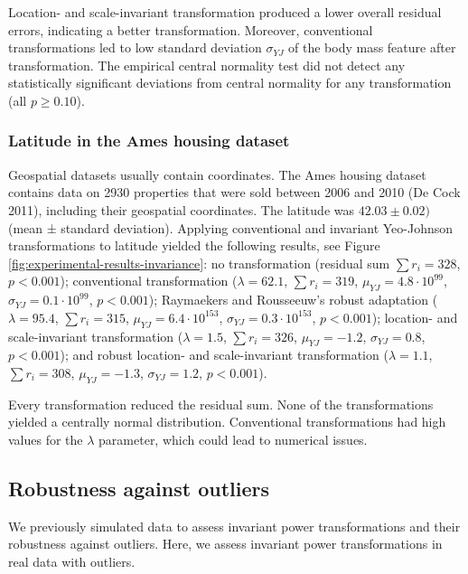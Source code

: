 \documentclass[
  a4paper,
]{article}
\begin{document}
Location- and scale-invariant transformation produced a lower overall
residual errors, indicating a better transformation. Moreover,
conventional transformations led to low standard deviation
\(\sigma_{YJ}\) of the body mass feature after transformation. The
empirical central normality test did not detect any statistically
significant deviations from central normality for any transformation
(all \(p \geq 0.10\)).

\subsubsection{Latitude in the Ames housing
dataset}\label{latitude-in-the-ames-housing-dataset}

Geospatial datasets usually contain coordinates. The Ames housing
dataset contains data on 2930 properties that were sold between 2006 and
2010 (De Cock 2011), including their geospatial coordinates. The
latitude was \(42.03 \pm 0.02)\) (mean ± standard deviation). Applying
conventional and invariant Yeo-Johnson transformations to latitude
yielded the following results, see Figure
\ref{fig:experimental-results-invariance}: no transformation (residual
sum \(\sum r_i = 328\), \(p < 0.001\)); conventional transformation
(\(\lambda = 62.1\), \(\sum r_i = 319\),
\(\mu_{YJ} = 4.8 \cdot 10^{99}\), \(\sigma_{YJ} = 0.1 \cdot 10^{99}\),
\(p < 0.001\)); Raymaekers and Rousseeuw's robust adaptation
(\(\lambda = 95.4\), \(\sum r_i = 315\),
\(\mu_{YJ} = 6.4 \cdot 10^{153}\), \(\sigma_{YJ} = 0.3 \cdot 10^{153}\),
\(p < 0.001\)); location- and scale-invariant transformation
(\(\lambda = 1.5\), \(\sum r_i = 326\), \(\mu_{YJ} = -1.2\),
\(\sigma_{YJ} = 0.8\), \(p < 0.001\)); and robust location- and
scale-invariant transformation (\(\lambda = 1.1\), \(\sum r_i = 308\),
\(\mu_{YJ} = -1.3\), \(\sigma_{YJ} = 1.2\), \(p < 0.001\)).

Every transformation reduced the residual sum. None of the
transformations yielded a centrally normal distribution. Conventional
transformations had high values for the \(\lambda\) parameter, which
could lead to numerical issues.

\subsection{Robustness against
outliers}\label{robustness-against-outliers}

We previously simulated data to assess invariant power transformations
and their robustness against outliers. Here, we assess invariant power
transformations in real data with outliers.
\end{document}
